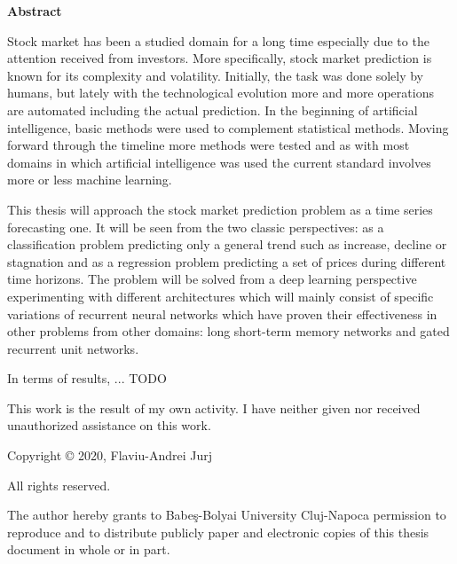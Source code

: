 \thispagestyle{plain}
\begin{center}
    \Large
    \textbf{Abstract}
\end{center}

Stock market has been a studied domain for a long time especially due to the
attention received from investors. More specifically, stock market prediction is known for its complexity and volatility. Initially, the task was done solely by humans, but lately with the technological evolution more and more operations are automated including the actual prediction. In the beginning of artificial intelligence, basic methods were used to complement statistical methods. Moving forward through the timeline more methods were tested and as with most domains in which artificial intelligence was used the current standard involves more or less machine learning. 

This thesis will approach the stock market prediction problem as a time series forecasting one. It will be seen from the two classic perspectives: as a classification problem predicting only a general trend such as increase, decline or stagnation and as a regression problem predicting a set of prices during different time horizons. The problem will be solved from a deep learning perspective experimenting with different architectures which will mainly consist of specific variations of recurrent neural networks which have proven their effectiveness in other problems from other domains: long short-term memory networks and gated recurrent unit networks.

In terms of results, ... TODO

This work is the result of my own activity. I have neither given nor received unauthorized assistance on this work.

\vfill
Copyright © 2020, Flaviu-Andrei Jurj

All rights reserved.

The author hereby grants to Babeş-Bolyai University Cluj-Napoca permission to reproduce and to distribute publicly paper and electronic copies of this thesis document in whole or in part.